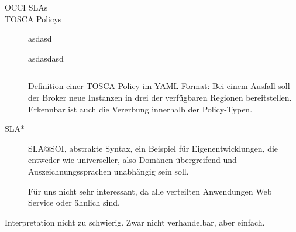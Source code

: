 \begin{description}




	\item[OCCI SLAs]





	\item[TOSCA Policys] asdasd
	
	asdasdasd
	
	\begin{listing}[ht]
		\inputminted[]{yaml}{./src/TOSCA.policy.sample.yaml}
		\caption{Definition einer TOSCA-Policy im YAML-Format: Bei einem Ausfall soll der Broker neue Instanzen in drei der verfügbaren Regionen bereitstellen. Erkennbar ist auch die Vererbung innerhalb der Policy-Typen.}
		\label{listing:tosca-policy}
	\end{listing}
	
	
	
	
	

\item[SLA*] SLA@SOI, abstrakte Syntax, ein Beispiel für Eigenentwicklungen, die entweder wie universeller, also Domänen-übergreifend und Auszeichnungssprachen unabhängig sein soll. 

Für uns nicht sehr interessant, da alle verteilten Anwendungen Web Service oder ähnlich sind.

\end{description}



Interpretation nicht zu schwierig. Zwar nicht verhandelbar, aber einfach.



